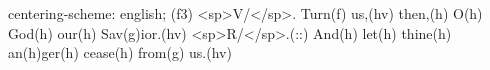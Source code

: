 centering-scheme: english;
(f3) <sp>V/</sp>. Turn(f) us,(hv) then,(h) O(h) God(h) our(h) Sav(g)ior.(hv) <sp>R/</sp>.(::) And(h) let(h) thine(h) an(h)ger(h) cease(h) from(g) us.(hv)